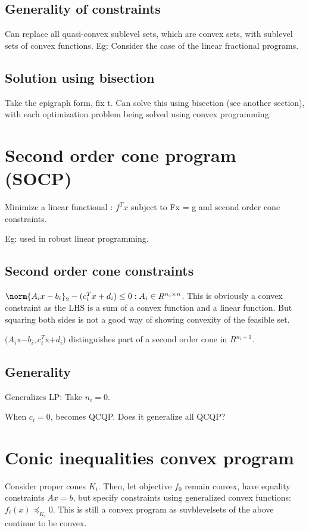 \documentclass[oneside, article]{memoir}
\begin{document}
\section{Generality of constraints}
Can replace all quasi-convex sublevel sets, which are convex sets, with sublevel sets of convex functions. Eg: Consider the case of the linear fractional programs.

\section{Solution using bisection}
Take the epigraph form, fix t. Can solve this using bisection (see another section), with each optimization problem being solved using convex programming.

\chapter{Second order cone program (SOCP)}
Minimize a linear functional : $f^{T}x$ subject to Fx = g and second order cone constraints.

Eg: used in robust linear programming.

\section{Second order cone constraints}
$\norm{A_i x - b_i}_2 -(c_i^{T} x + d_i)\leq 0: A_i \in R^{n_i \times n}$. This is obviously a convex constraint as the LHS is a sum of a convex function and a linear function. But squaring both sides is not a good way of showing convexity of the feasible set.

$(A_i $x$ - b_i, c_i^{T} $x$ + d_i)$ distinguishes part of a second order cone in $R^{n_i + 1}$.

\section{Generality}
Generalizes LP:  Take $n_i = 0$.

When $c_i = 0$, becomes QCQP. Does it generalize all QCQP? \chk

\chapter{Conic inequalities convex program}
Consider proper cones $K_i$. Then, let objective $f_0$ remain convex, have equality constraints $Ax = b$, but specify constraints using generalized convex functions: $f_i(x) \preceq_{K_i} 0$. This is still a convex program as suvblevelsets of the above continue to be convex.
\end{document}
